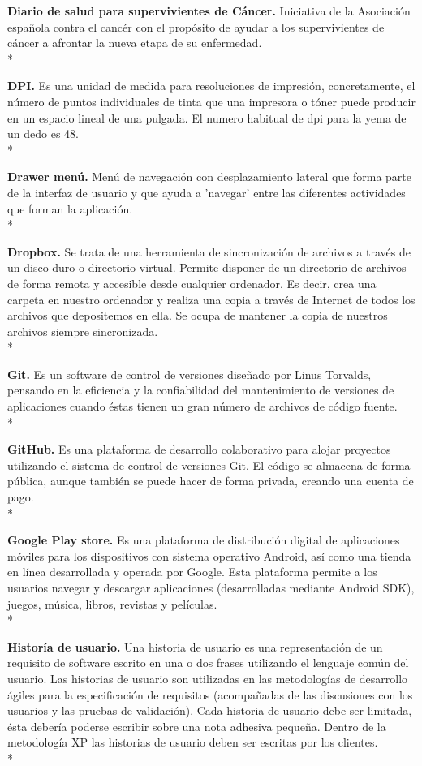 \documentclass[../pfc.tex]{subfiles}
\begin{document}
	\textbf{Diario de salud para supervivientes de Cáncer.}
	Iniciativa de la Asociación española contra el cancér con el propósito de ayudar a los supervivientes de cáncer a afrontar la nueva etapa de su enfermedad.\\*
	
	\textbf{DPI.}
	Es una unidad de medida para resoluciones de impresión, concretamente, el número de puntos individuales de tinta que una impresora o tóner puede producir en un espacio lineal de una pulgada.
	El numero habitual de dpi para la yema de un dedo es 48.\\*
	
	\textbf{Drawer menú.}
	Menú de navegación con desplazamiento lateral que forma parte de la interfaz de usuario y que ayuda a 'navegar' entre las diferentes actividades que forman la aplicación.\\*
	
	\textbf{Dropbox.}
	Se trata de una herramienta de sincronización de archivos a través de un disco duro o
	directorio virtual. Permite disponer de un directorio de archivos de forma remota y accesible desde
	cualquier ordenador. Es decir, crea una carpeta en nuestro ordenador y realiza una copia a través
	de Internet de todos los archivos que depositemos en ella. Se ocupa de mantener la copia de
	nuestros archivos siempre sincronizada.\\*
	
	\textbf{Git.}
	Es un software de control de versiones diseñado por Linus Torvalds, pensando en la eficiencia y la confiabilidad del mantenimiento de versiones de aplicaciones cuando éstas tienen un gran número de archivos de código fuente. \\*
	
	\textbf{GitHub.}
	Es una plataforma de desarrollo colaborativo para alojar proyectos utilizando el sistema de control de versiones Git.
	El código se almacena de forma pública, aunque también se puede hacer de forma privada, creando una cuenta de pago.\\*
	
	\textbf{Google Play store.}
	Es una plataforma de distribución digital de aplicaciones móviles para los dispositivos con sistema operativo Android, así como una tienda en línea desarrollada y operada por Google. Esta plataforma permite a los usuarios navegar y descargar aplicaciones (desarrolladas mediante Android SDK), juegos, música, libros, revistas y películas.\\*
	
	\textbf{Historía de usuario.}
	Una historia de usuario es una representación de un requisito de software escrito en una o dos frases utilizando el lenguaje común del usuario. Las historias de usuario son utilizadas en las metodologías de desarrollo ágiles para la especificación de requisitos (acompañadas de las discusiones con los usuarios y las pruebas de validación). Cada historia de usuario debe ser limitada, ésta debería poderse escribir sobre una nota adhesiva pequeña. Dentro de la metodología XP las historias de usuario deben ser escritas por los clientes.\\*
	
\end{document}
